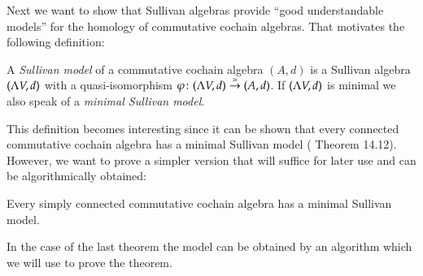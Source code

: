 Next we want to show that Sullivan algebras provide ``good understandable models'' for the homology of commutative cochain algebras. That motivates
the following definition:

\begin{Definition}
  A \emph{Sullivan model} of a commutative cochain algebra $(A,d)$ is a Sullivan algebra $(\Lambda V,d)$ with a quasi-isomorphism
  $\varphi \colon (\Lambda V,d) \overset{\simeq}{\to} (A,d)$. If $(\Lambda V,d)$ is minimal we also speak of a 
  \emph{minimal Sullivan model}.
\end{Definition}

This definition becomes interesting since it can be shown that every connected commutative cochain algebra has a minimal Sullivan model
(\cite{Felix2001} Theorem 14.12). However, we want to prove a simpler version that will suffice for later use and can
be algorithmically obtained:

\begin{Theorem}
 Every simply connected commutative cochain algebra has a minimal Sullivan model.
\end{Theorem}

In the case of the last theorem the model can be obtained by an algorithm which we will use to prove the theorem.


